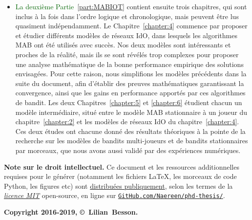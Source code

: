 \begin{resume_fr}
\begin{itemize}
    \item
\textcolor{darkgreen}{La deuxième Partie~\ref{part:MABIOT}} contient ensuite trois chapitres, qui sont inclus à la fois dans l'ordre logique et chronologique, mais peuvent être lus quasiment indépendamment.
Le Chapitre~\ref{chapter:4} commence par proposer et étudier différents modèles de réseaux IdO, dans lesquels les algorithmes MAB ont été utilisés avec succès. Nos deux modèles sont intéressants et proches de la réalité, mais ils se sont révélés trop complexes pour proposer une analyse mathématique de la bonne performance empirique des solutions envisagées.
Pour cette raison, nous simplifions les modèles précédents dans la suite du document,
afin d'établir des preuves mathématiques garantissant la convergence, ainsi que les gains en performance apportés par ces algorithmes de bandit.
Les deux Chapitres~\ref{chapter:5} et \ref{chapter:6} étudient chacun un modèle intermédiaire, situé entre le modèle MAB stationnaire à un joueur du chapitre~\ref{chapter:2} et les modèles de réseaux IdO du chapitre~\ref{chapter:4}.
Ces deux études ont chacune donné des résultats théoriques à la pointe de la recherche sur les modèles de bandits multi-joueurs et de bandits stationnaires par morceaux, que nous avons aussi validé par des expériences numériques.

\end{itemize}


\vfill{}

\textbf{Note sur le droit intellectuel.}
%
Ce document et les ressources additionnelles requises pour le générer (notamment les fichiers \LaTeX, les morceaux de code Python, les figures etc)
sont \href{https://github.com/Naereen/phd-thesis/}{distribuées publiquement},
selon les termes de la \href{https://lbesson.mit-license.org/}{\emph{licence MIT}} open-source,
en ligne sur \href{https://github.com/Naereen/phd-thesis/}{\texttt{GitHub.com/Naereen/phd-thesis/}}.


\begin{center}
    \textbf{Copyright 2016-2019, \copyright ~Lilian~Besson.}
\end{center}


\end{resume_fr}

